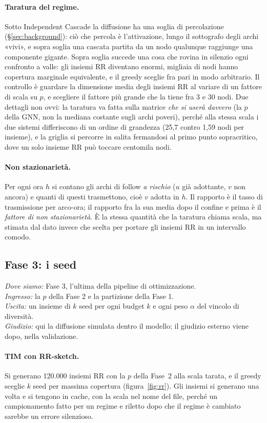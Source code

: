 \documentclass[11pt,a4paper]{article}
\newcommand{\dovesiamo}[4]{\par\noindent\begingroup\small\color{black!55}
  \textit{Dove siamo:} #1\\
  \textit{Ingresso:} #2\\
  \textit{Uscita:} #3\\
  \textit{Giudizio:} #4\par\endgroup\medskip}
\begin{document}
\paragraph{Taratura del regime.} Sotto Independent Cascade la diffusione ha una soglia di percolazione (\S\ref{sec:background}): ciò che percola è l'attivazione, lungo il sottografo degli archi «vivi», e sopra soglia una cascata partita da un nodo qualunque raggiunge una componente gigante. Sopra soglia succede una cosa che rovina in silenzio ogni confronto a valle: gli insiemi RR diventano enormi, migliaia di nodi hanno copertura marginale equivalente, e il greedy sceglie fra pari in modo arbitrario. Il controllo è guardare la dimensione media degli insiemi RR al variare di un fattore di scala su $p$, e scegliere il fattore più grande che la tiene fra 3 e 30 nodi. Due dettagli non ovvi: la taratura va fatta sulla matrice \emph{che si userà davvero} (la $p$ della GNN, non la mediana costante sugli archi poveri), perché alla stessa scala i due sistemi differiscono di un ordine di grandezza (25,7 contro 1,59 nodi per insieme), e la griglia si percorre in salita fermandosi al primo punto sopracritico, dove un solo insieme RR può toccare centomila nodi.

\paragraph{Non stazionarietà.} Per ogni ora $h$ si contano gli archi di follow \emph{a rischio} ($u$ già adottante, $v$ non ancora) e quanti di questi trasmettono, cioè $v$ adotta in $h$. Il rapporto è il tasso di trasmissione per arco-ora; il rapporto fra la sua media dopo il confine e prima è il \emph{fattore di non stazionarietà}. È la stessa quantità che la taratura chiama scala, ma stimata dal dato invece che scelta per portare gli insiemi RR in un intervallo comodo.

\subsection{Fase 3: i seed}
\label{sec:met-fase3}
\dovesiamo{Fase 3, l'ultima della pipeline di ottimizzazione.}{la $p$ della Fase 2 e la partizione della Fase 1.}{un insieme di $k$ seed per ogni budget $k$ e ogni peso $\alpha$ del vincolo di diversità.}{qui la diffusione simulata dentro il modello; il giudizio esterno viene dopo, nella validazione.}
\paragraph{TIM con RR-sketch.} Si generano 120.000 insiemi RR \citep{borgs2014,tang2014} con la $p$ della Fase~2 alla scala tarata, e il greedy sceglie $k$ seed per massima copertura (figura~\ref{fig:rr}). Gli insiemi si generano una volta e si tengono in cache, con la scala nel nome del file, perché un campionamento fatto per un regime e riletto dopo che il regime è cambiato sarebbe un errore silenzioso.
\end{document}
